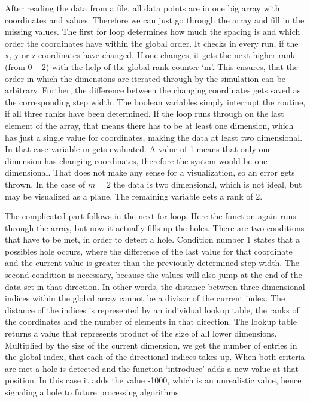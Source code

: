 After reading the data from a file, all data points are in one big array with coordinates and values. Therefore we can just go through the array and fill in the missing values. The first for loop determines how much the spacing is and which order the coordinates have within the global order. It checks in every run, if the x, y or z coordinates have changed. If one changes, it gets the next higher rank (from 0 -- 2) with the help of the global rank counter `m'. This ensures, that the order in which the dimensions are iterated through by the simulation can be arbitrary. Further, the difference between the changing coordinates gets saved as the corresponding step width. The boolean variables simply interrupt the routine, if all three ranks have been determined. If the loop runs through on the last element of the array, that means there has to be at least one dimension, which has just a single value for coordinates, making the data at least two dimensional. In that case variable m gets evaluated. A value of 1 means that only one dimension has changing coordinates, therefore the system would be one dimensional. That does not make any sense for a visualization, so an error gets thrown. In the case of $m=2$ the data is two dimensional, which is not ideal, but may be visualized as a plane. The remaining variable gets a rank of 2.

The complicated part follows in the next for loop. Here the function again runs through the array, but now it actually fills up the holes. There are two conditions that have to be met, in order to detect a hole. Condition number 1 states that a possibles hole occurs, where the difference of the last value for that coordinate and the current value is greater than the previously determined step width. The second condition is necessary, because the values will also jump at the end of the data set in that direction. In other words, the distance between  three dimensional indices within the global array cannot be a divisor of the current index. The distance of the indices is represented by an individual lookup table, the ranks of the coordinates and the number of elements in that direction. The lookup table returns a value that represents product of the size of all lower dimensions. Multiplied by the size of the current dimension, we get the number of entries in the global index, that each of the directional indices takes up. When both criteria are met a hole is detected and the function `introduce' adds a new value at that position. In this case it adds the value -1000, which is an unrealistic value, hence signaling a hole to future processing algorithms.
